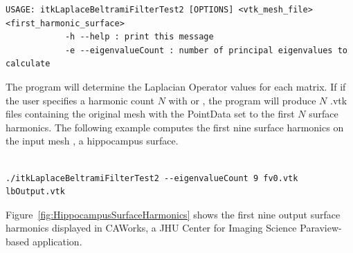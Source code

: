 \documentclass{InsightArticle}
\begin{document}
\small
\begin{verbatim}
USAGE: itkLaplaceBeltramiFilterTest2 [OPTIONS] <vtk_mesh_file> <first_harmonic_surface>
            -h --help : print this message
            -e --eigenvalueCount : number of principal eigenvalues to calculate

\end{verbatim}
\normalsize

The program will determine the Laplacian Operator values for each matrix.  If
if the user specifies a harmonic count $N$ with  or 
, the program will produce $N$ .vtk files containing
the original mesh with the PointData set to the first $N$ surface harmonics.
The following example computes the first nine surface harmonics on the input
mesh , a hippocampus surface.

\small
\begin{verbatim}

./itkLaplaceBeltramiFilterTest2 --eigenvalueCount 9 fv0.vtk lbOutput.vtk

\end{verbatim}
\normalsize

Figure~\ref{fig:HippocampusSurfaceHarmonics} shows the first nine output surface
harmonics displayed in CAWorks, a JHU Center for
Imaging Science Paraview-based application.
\end{document}
